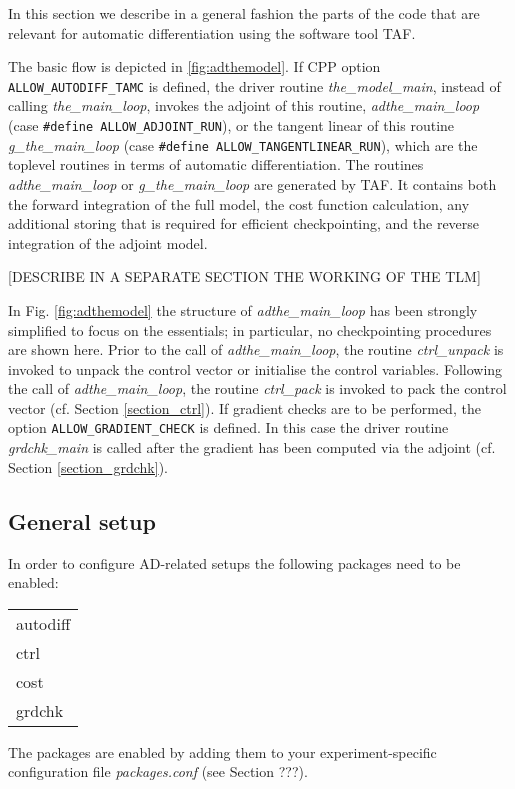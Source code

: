 In this section we describe in a general fashion 
the parts of the code that are relevant for automatic
differentiation using the software tool TAF. 



The basic flow is depicted in \ref{fig:adthemodel}.
If CPP option \texttt{ALLOW\_AUTODIFF\_TAMC} is defined, 
the driver routine
{\it the\_model\_main}, instead of calling {\it the\_main\_loop},
invokes the adjoint of this routine, {\it adthe\_main\_loop}
(case \texttt{\#define ALLOW\_ADJOINT\_RUN}), or
the tangent linear of this routine {\it g\_the\_main\_loop}
(case \texttt{\#define ALLOW\_TANGENTLINEAR\_RUN}),
which are the toplevel routines in terms of automatic differentiation.
The routines {\it adthe\_main\_loop} or {\it g\_the\_main\_loop}
are generated by TAF.
It contains both the forward integration of the full model, the
cost function calculation, 
any additional storing that is required for efficient checkpointing, 
and the reverse integration of the adjoint model.

[DESCRIBE IN A SEPARATE SECTION THE WORKING OF THE TLM]

In Fig. \ref{fig:adthemodel}
the structure of {\it adthe\_main\_loop} has been strongly
simplified to focus on the essentials; in particular, no checkpointing
procedures are shown here.
Prior to the call of {\it adthe\_main\_loop}, the routine
{\it ctrl\_unpack} is invoked to unpack the control vector
or initialise the control variables.
Following the call of {\it adthe\_main\_loop}, 
the routine {\it ctrl\_pack}
is invoked to pack the control vector
(cf. Section \ref{section_ctrl}).
If gradient checks are to be performed, the option 
{\tt ALLOW\_GRADIENT\_CHECK} is defined. In this case
the driver routine {\it grdchk\_main} is called after
the gradient has been computed via the adjoint
(cf. Section \ref{section_grdchk}).


\subsection{General setup
\label{section_ad_setup}}

In order to configure AD-related setups the following packages need
to be enabled:
{\it
\begin{table}[h!]
\begin{tabular}{l}
autodiff \\
ctrl \\
cost \\
grdchk \\
\end{tabular}
\end{table}
}
The packages are enabled by adding them to your experiment-specific 
configuration file
{\it packages.conf} (see Section ???).

